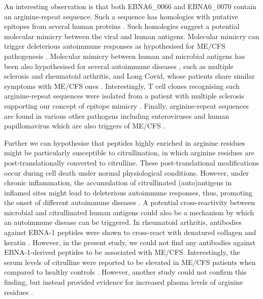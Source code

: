 An interesting observation is that both EBNA6\_0066 and EBNA6\_0070 contain an arginine-repeat sequence. Such a sequence has homologies with putative epitopes from several human proteins \citep{sospedra2005RecognitionConserved}. Such homologies suggest a potential molecular mimicry between the viral and human antigens. Molecular mimicry can trigger deleterious autoimmune responses as hypothesised for ME/CFS pathogenesis \citep{blomberg2018InfectionEliciteda, phelanPotentialAntigenicMimicry2020}. Molecular mimicry between human and microbial antigens has been also hypothesised for several autoimmune diseases \citep{rojas2018MolecularMimicry}, such as multiple sclerosis and rheumatoid arthritis, and Long Covid, whose patients share similar symptoms with ME/CFS ones \citep{moss-morris2003IllnessPerceptions, gaberMultipleSclerosisChronic2014, ali2017FatiguePsychosocial, komaroff2021InsightsMyalgic}. Interestingly, T cell clones recognising such arginine-repeat sequences were isolated from a patient with multiple sclerosis supporting our concept of epitope mimicry \citep{sospedra2005RecognitionConserved}. Finally, arginine-repeat sequences are found in various other pathogens including enteroviruses and human papillomavirus which are also triggers of ME/CFS \citep{rasa2018ChronicViral}.

Further we can hypothesise that peptides highly enriched in arginine residues might be particularly susceptible to citrullination, in which arginine residues are post-translationally converted to citrulline. These post-translational modifications occur during cell death under normal physiological conditions. However, under chronic inflammation, the accumulation of citrullinated (auto)antigens in inflamed sites might lead to deleterious autoimmune responses, thus, promoting the onset of different autoimmune diseases \citep{alghamdi2019OverviewIntrinsic}. A potential cross-reactivity between microbial and citrullinated human antigens could also be a mechanism by which an autoimmune disease can be triggered. In rheumatoid arthritis, antibodies against EBNA-1 peptides were shown to cross-react with denatured collagen and keratin \citep{birkenfeld1990CrossreactivityEBNA1}. However, in the present study, we could not find any antibodies against EBNA-1-derived peptides to be associated with ME/CFS. Interestingly, the serum levels of citrulline were reported to be elevated in ME/CFS patients when compared to healthy controls \citep{pall2002LevelsNitric}. However, another study could not confirm this finding, but instead provided evidence for increased plasma levels of arginine residues \citep{naviaux2016MetabolicFeatures}.

